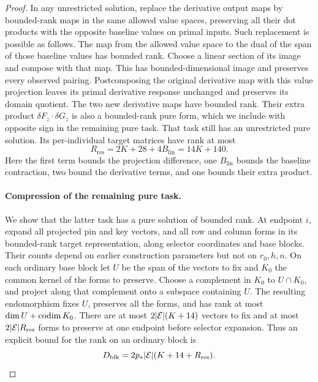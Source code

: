 \begin{proof}
In any unrestricted solution, replace the derivative output
maps by bounded-rank maps in the same allowed value spaces,
preserving all their dot products with the opposite baseline
values on primal inputs.  Such replacement is possible as
follows.  The map from the allowed value space to the dual
of the span of those baseline values has bounded rank.
Choose a linear section of its image and compose with that
map.  This has bounded-dimensional image and preserves every
observed pairing.  Postcomposing the original derivative map
with this value projection leaves its primal derivative
response unchanged and preserves its domain quotient.
The two new derivative maps have bounded rank.  Their extra
product $\delta F_z\cdot\delta G_z$ is also a bounded-rank
pure form, which we include with opposite sign in the
remaining pure task.  That task still has an unrestricted
pure solution.  Its per-individual target matrices have rank at
most
\begin{equation}\label{eq:residual-rank-bound}
 R_{\mathrm{res}}=2K+28+4B_{\mathrm{lin}}=14K+140.
\end{equation}
Here the first term bounds the projection difference, one
$B_{\mathrm{lin}}$ bounds the baseline contraction, two bound
the derivative terms, and one bounds their extra product.

\paragraph{Compression of the remaining pure task.}
We show that the latter task has a pure solution of bounded
rank.  At endpoint $i$, expand all projected pin and key
vectors, and all row and column forms in its bounded-rank
target representation, along selector coordinates and base
blocks.  Their counts depend on earlier construction
parameters but not on $r_0,h,n$.  On each ordinary base block
let $U$ be the span of the vectors to fix and $K_0$ the common
kernel of the forms to preserve.  Choose a complement in
$K_0$ to $U\cap K_0$, and project along that complement onto
a subspace containing $U$.  The resulting endomorphism fixes
$U$, preserves all the forms, and has rank at most
$\dim U+\operatorname{codim} K_0$.  There are at most
$2|\mathcal E|(K+14)$ vectors to fix and at most
$2|\mathcal E|R_{\mathrm{res}}$ forms to preserve at one endpoint
before selector expansion.  Thus an explicit bound for the
rank on an ordinary block is
\begin{equation}\label{eq:block-compression-bound}
 D_{\mathrm{blk}}
 =2p_*|\mathcal E|(K+14+R_{\mathrm{res}}).
\end{equation}


\end{proof}
